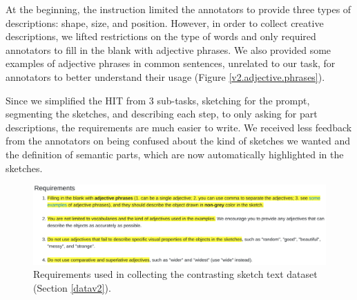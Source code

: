At the beginning, the instruction limited the annotators to provide three types of descriptions: shape, size, and position. 
However, in order to collect creative descriptions, we lifted restrictions on the type of words and only required annotators to fill in the blank with adjective phrases. We also provided some examples of adjective phrases in common sentences, unrelated to our task, for annotators to better understand their usage (Figure \ref{v2.adjective.phrases}). 

Since we simplified the HIT from 3 sub-tasks, sketching for the prompt, segmenting the sketches, and describing each step, to only asking for part descriptions, the requirements are much easier to write. 
We received less feedback from the annotators on being confused about the kind of sketches we wanted and the definition of semantic parts, which are now automatically highlighted in the sketches.   

\begin{figure}[!htb]
\centering
\includegraphics[width=\linewidth]{data_collection/version2/v2requirement.png}  
\caption{Requirements used in collecting the contrasting sketch text dataset (Section \ref{datav2}).}
\label{v2.requirement.1}
\end{figure}

